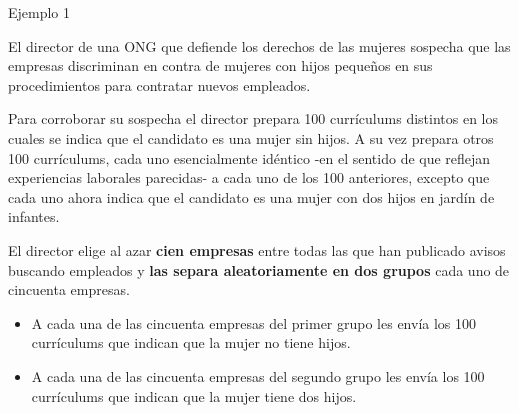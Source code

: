 \documentclass{beamer}
\theoremstyle{definition}
\begin{document}
\begin{frame}{\color{rosee} Ejemplo 1}
   \small
   
   El director de una ONG que defiende los derechos de las mujeres sospecha que las empresas discriminan en contra de mujeres con hijos pequeños en sus
procedimientos para contratar nuevos empleados. 

\medskip

Para corroborar su sospecha el director prepara 100 curr\'iculums distintos en los cuales se indica que el
candidato es una mujer sin hijos. A su vez prepara otros 100 curr\'iculums, cada uno esencialmente id\'entico -en el sentido de que reflejan experiencias laborales parecidas- a cada uno de los 100 anteriores, excepto que cada uno ahora indica que el candidato es una mujer con dos hijos en jard\'in de infantes.

El director elige al azar \textbf{cien empresas} entre todas las que han publicado avisos
buscando empleados y \textbf{las separa aleatoriamente en dos grupos} cada uno de
cincuenta empresas.

    
    
   \begin{itemize}
        \item A cada una de las cincuenta empresas del primer grupo les envía los 100 currículums que indican que la mujer no tiene hijos.
        \medskip
        \item A cada una de las cincuenta empresas del segundo grupo les envía los 100 currículums que indican que la mujer tiene dos hijos.
        \medskip
    \end{itemize} 
   \medskip
\end{frame}
\end{document}
